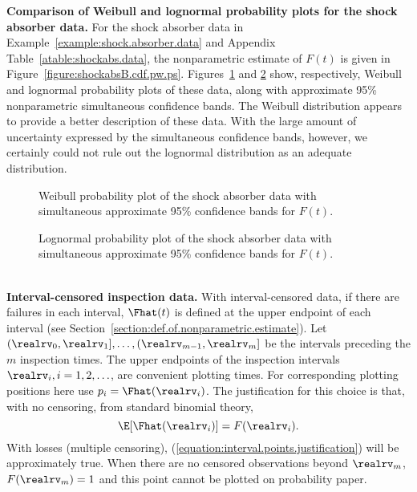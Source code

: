 \begin{example}
{\bf Comparison of Weibull and lognormal probability plots for the
shock absorber data.} For the shock absorber data
in Example~\ref{example:shock.absorber.data} and Appendix
Table~\ref{atable:shockabs.data},
the nonparametric estimate of $F(t)$ is given in
Figure~\ref{figure:shockabsB.cdf.pw.ps}.
Figures~\ref{figure:shockabsB.npp.weib.ps} and
\ref{figure:shockabsB.npp.lnor.ps} show, respectively, Weibull and
lognormal probability plots of these data, along with approximate 95\%
nonparametric simultaneous confidence bands.
The Weibull distribution appears to provide a better
description of these data.
With the large amount of uncertainty
expressed by the simultaneous confidence bands, however, we certainly
could not rule out the lognormal distribution as an adequate
distribution.
\end{example}
\begin{figure}
\caption{Weibull probability plot of the shock absorber data with
simultaneous approximate 95\% confidence bands for $F(t)$.}
\label{figure:shockabsB.npp.weib.ps}
\end{figure}
\begin{figure}
\caption{Lognormal probability plot of the shock absorber data with
simultaneous approximate 95\% confidence bands for
$F(t)$.}
\label{figure:shockabsB.npp.lnor.ps}
\end{figure}

\mbox{ }\\
\noindent
{\bf Interval-censored inspection data.}
With interval-censored data, if there are failures in each interval,
$\Fhat(t)$ is defined at the upper endpoint
of each interval (see
Section~\ref{section:def.of.nonparametric.estimate}).  Let
$(\realrv_{0}, \realrv_{1}], \ldots, (\realrv_{m-1}, \realrv_{m}]$ be the
intervals preceding the $m$ inspection times.  The upper endpoints of
the inspection intervals $\realrv_{i}, i=1,2,\ldots$, 
are convenient plotting times.  For corresponding
plotting positions here use $p_{i}=\Fhat(\realrv_{i})$.  
The justification for this choice is that, with no censoring, 
from standard binomial theory,
\begin{equation}
\label{equation:interval.points.justification}
\E [\Fhat(\realrv_{i})]=F(\realrv_{i}).
\end{equation}
With losses (multiple censoring), 
(\ref{equation:interval.points.justification}) will be
approximately true. When there are no
censored observations beyond $\realrv_{m}$,
$F(\realrv_{m})=1$ and this point cannot be plotted on
probability paper. 

